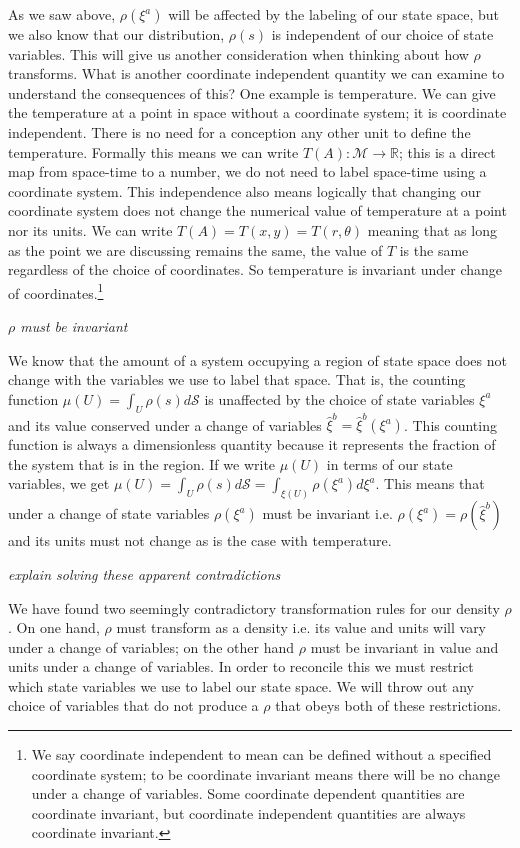 \documentclass{article}
\begin{document}
	 As we saw above, $\rho(\xi^a)$ will be affected by the labeling of our state space, but we also know that our distribution, $\rho(s)$ is independent of our choice of state variables. This will give us another consideration when thinking about how $\rho$ transforms. What is another coordinate independent quantity we can examine to understand the consequences of this? One example is temperature. We can give the temperature at a point in space without a coordinate system; it is coordinate independent. There is no need for a conception any other unit to define the temperature. Formally this means we can write $T(A): \mathcal{M} \to \mathbb{R}$; this is a direct map from space-time to a number, we do not need to label space-time using a coordinate system. This independence also means logically that changing our coordinate system does not change the numerical value of temperature at a point nor its units. We can write $T(A) = T(x,y) = T(r,\theta)$ meaning that as long as the point we are discussing remains the same, the value of $T$ is the same regardless of the choice of coordinates. So temperature is invariant under change of coordinates.\footnote{We say coordinate independent to mean can be defined without a specified coordinate system; to be coordinate invariant means there will be no change under a change of variables. Some coordinate dependent quantities are coordinate invariant, but coordinate independent quantities are always coordinate invariant.}
	 
	\emph{$\rho$ must be invariant}
 
	We know that the amount of a system occupying a region of state space does not change with the variables we use to label that space. That is, the counting function $\mu(U) = \int_U \rho(s) d\mathcal{S}$ is unaffected  by the choice of state variables $\xi^a$ and its value conserved under a change of variables $\hat{\xi}^b = \hat{\xi}^b(\xi^a)$. This counting function is always a dimensionless quantity because it represents the fraction of the system that is in the region. If we write $\mu(U)$ in terms of our state variables, we get $\mu(U) = \int_U \rho(s) d\mathcal{S} = \int_{\xi(U)} \rho(\xi^a) d\xi^a$. This means that under a change of state variables $\rho(\xi^a)$ must be invariant i.e. $\rho(\xi^a) = \rho(\hat{\xi}^b)$ and its units must not change as is the case with temperature.
	
	\emph{explain solving these apparent contradictions}

	We have found two seemingly contradictory transformation rules for our density $\rho$. On one hand, $\rho$ must transform as a density i.e. its value and units will vary under a change of variables; on the other hand $\rho$ must be invariant in value and units under a change of variables. In order to reconcile this we must restrict which state variables we use to label our state space. We will throw out any choice of variables that do not produce a $\rho$ that obeys both of these restrictions.
	
\end{document}
